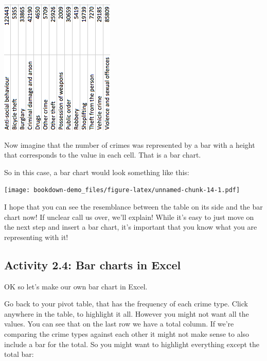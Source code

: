 \documentclass[
]{book}
\begin{document}
\includegraphics{imgs/table_on_side.png}

Now imagine that the number of crimes was represented by a bar with a height that corresponds to the value in each cell. That is a bar chart.

So in this case, a bar chart would look something like this:

\texttt{[image: bookdown-demo\_files/figure-latex/unnamed-chunk-14-1.pdf]}

I hope that you can see the resemblance between the table on its side and the bar chart now! If unclear call us over, we'll explain! While it's easy to just move on the next step and insert a bar chart, it's important that you know what you are representing with it!

\hypertarget{activity-2.4-bar-charts-in-excel}{%
\subsection{Activity 2.4: Bar charts in Excel}\label{activity-2.4-bar-charts-in-excel}}

OK so let's make our own bar chart in Excel.

Go back to your pivot table, that has the frequency of each crime type. Click anywhere in the table, to highlight it all. However you might not want all the values. You can see that on the last row we have a total column. If we're comparing the crime types against each other it might not make sense to also include a bar for the total. So you might want to highlight everything except the total bar:
\end{document}
